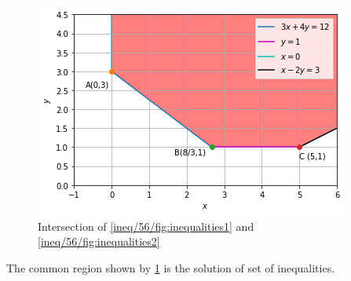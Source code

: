     \begin{figure}[!ht]
    \centering
    \includegraphics[width=\columnwidth]{solutions/su2021/2/56/Figure 9_3.png}
    \caption{Intersection of \ref{ineq/56/fig:inequalities1} and \ref{ineq/56/fig:inequalities2}}
    \label{ineq/56/fig:inequality3}	
    \end{figure}
    The common region shown by \ref{ineq/56/fig:inequality3} is the solution of set of inequalities.
    